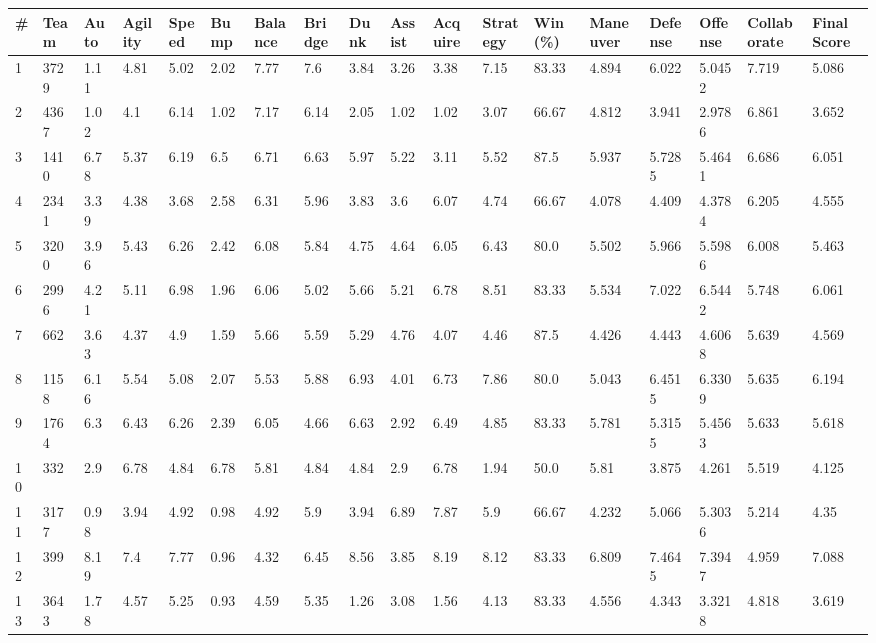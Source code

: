 \documentclass[landscape, 10pt]{report}
\begin{document}
\begin{longtable}{l || l || l | l | l | l | l | l | l | l | l | l | l || l | l | l | l | l} 
\# & Team & Auto & Agility & Speed & Bump & Balance & Bridge & Dunk & Assist & Acquire & Strategy & Win (\%) & Maneuver & Defense & Offense & Collaborate & Final Score \\ \hline \endhead 
\rowcolor{lightgray}1 & 3729 & 1.11 & 4.81 & 5.02 & 2.02 & 7.77 & 7.6 & 3.84 & 3.26 & 3.38 & 7.15 & 83.33 & 4.894 & 6.022 & 5.0452 & 7.719 & 5.086\\ 
2 & 4367 & 1.02 & 4.1 & 6.14 & 1.02 & 7.17 & 6.14 & 2.05 & 1.02 & 1.02 & 3.07 & 66.67 & 4.812 & 3.941 & 2.9786 & 6.861 & 3.652\\ 
\rowcolor{lightgray}3 & 1410 & 6.78 & 5.37 & 6.19 & 6.5 & 6.71 & 6.63 & 5.97 & 5.22 & 3.11 & 5.52 & 87.5 & 5.937 & 5.7285 & 5.4641 & 6.686 & 6.051\\ 
4 & 2341 & 3.39 & 4.38 & 3.68 & 2.58 & 6.31 & 5.96 & 3.83 & 3.6 & 6.07 & 4.74 & 66.67 & 4.078 & 4.409 & 4.3784 & 6.205 & 4.555\\ 
\rowcolor{lightgray}5 & 3200 & 3.96 & 5.43 & 6.26 & 2.42 & 6.08 & 5.84 & 4.75 & 4.64 & 6.05 & 6.43 & 80.0 & 5.502 & 5.966 & 5.5986 & 6.008 & 5.463\\ 
6 & 2996 & 4.21 & 5.11 & 6.98 & 1.96 & 6.06 & 5.02 & 5.66 & 5.21 & 6.78 & 8.51 & 83.33 & 5.534 & 7.022 & 6.5442 & 5.748 & 6.061\\ 
\rowcolor{lightgray}7 & 662 & 3.63 & 4.37 & 4.9 & 1.59 & 5.66 & 5.59 & 5.29 & 4.76 & 4.07 & 4.46 & 87.5 & 4.426 & 4.443 & 4.6068 & 5.639 & 4.569\\ 
8 & 1158 & 6.16 & 5.54 & 5.08 & 2.07 & 5.53 & 5.88 & 6.93 & 4.01 & 6.73 & 7.86 & 80.0 & 5.043 & 6.4515 & 6.3309 & 5.635 & 6.194\\ 
\rowcolor{lightgray}9 & 1764 & 6.3 & 6.43 & 6.26 & 2.39 & 6.05 & 4.66 & 6.63 & 2.92 & 6.49 & 4.85 & 83.33 & 5.781 & 5.3155 & 5.4563 & 5.633 & 5.618\\ 
10 & 332 & 2.9 & 6.78 & 4.84 & 6.78 & 5.81 & 4.84 & 4.84 & 2.9 & 6.78 & 1.94 & 50.0 & 5.81 & 3.875 & 4.261 & 5.519 & 4.125\\ 
\rowcolor{lightgray}11 & 3177 & 0.98 & 3.94 & 4.92 & 0.98 & 4.92 & 5.9 & 3.94 & 6.89 & 7.87 & 5.9 & 66.67 & 4.232 & 5.066 & 5.3036 & 5.214 & 4.35\\ 
12 & 399 & 8.19 & 7.4 & 7.77 & 0.96 & 4.32 & 6.45 & 8.56 & 3.85 & 8.19 & 8.12 & 83.33 & 6.809 & 7.4645 & 7.3947 & 4.959 & 7.088\\ 
\rowcolor{lightgray}13 & 3643 & 1.78 & 4.57 & 5.25 & 0.93 & 4.59 & 5.35 & 1.26 & 3.08 & 1.56 & 4.13 & 83.33 & 4.556 & 4.343 & 3.3218 & 4.818 & 3.619\\ 

\end{longtable}
\end{document}
